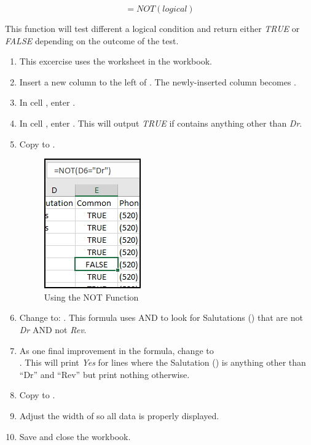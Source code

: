 \[ =NOT(logical) \]

This function will test different a logical condition and return either \textit{TRUE} or \textit{FALSE} depending on the outcome of the test.

\begin{enumerate}
	\item This excercise uses the  worksheet in the  workbook.
	\item Insert a new column to the left of . The newly-inserted column becomes .
	\item In cell , enter .
	\item In cell , enter . This will output \textit{TRUE} if  contains anything other than \textit{Dr}. 
	\item Copy  to .
	
	\begin{figure}[H]
		\centering
		\includegraphics[width=\maxwidth{.50\linewidth}]{gfx/ch09_fig48}
		\caption{Using the NOT Function}
		\label{09:fig48}
	\end{figure}
	
	\item Change  to: . This formula uses AND to look for Salutations () that are not \textit{Dr} AND not \textit{Rev}.
	\item As one final improvement in the formula, change  to  \\. This will print \textit{Yes} for lines where the Salutation () is anything other than ``Dr'' and ``Rev'' but print nothing otherwise.	
	\item Copy  to .
	\item Adjust the width of  so all data is properly displayed.
	\item Save and close the  workbook.
\end{enumerate}

